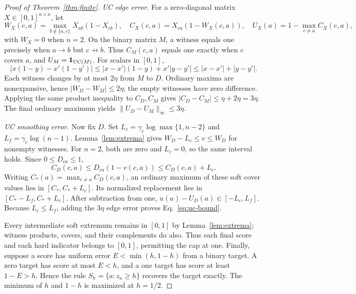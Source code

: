 \begin{proof}[Proof of Theorem~\ref{thm:finite}]
\emph{UC edge error.} For a zero-diagonal matrix $X\in[0,1]^{n\times n}$, let
\[
W_X(c,a)=\max_{b\notin\{a,c\}}X_{ab}(1-X_{cb}),\quad
C_X(c,a)=X_{ca}(1-W_X(c,a)),\quad
U_X(a)=1-\max_{c\ne a}C_X(c,a),
\]
with $W_X=0$ when $n=2$. On the binary matrix $M$, a witness equals one precisely when $a\to b$ but $c\not\to b$. Thus $C_M(c,a)$ equals one exactly when $c$ covers $a$, and $U_M=\mathbf1_{\mathrm{UC}(M)}$.
For scalars in $[0,1]$,
\[
|x(1-y)-x'(1-y')|
\le |x-x'|(1-y)+x'|y-y'|\le |x-x'|+|y-y'|.
\]
Each witness changes by at most $2\eta$ from $M$ to $D$. Ordinary maxima are nonexpansive, hence $|W_D-W_M|\le2\eta$; the empty witnesses have zero difference. Applying the same product inequality to $C_D,C_M$ gives $|C_D-C_M|\le\eta+2\eta=3\eta$. The final ordinary maximum yields $\|U_D-U_M\|_\infty\le3\eta$.

\emph{UC smoothing error.} Now fix $D$. Set $L_c=\gamma_c\log\max\{1,n-2\}$ and $L_f=\gamma_c\log(n-1)$. Lemma~\ref{lem:extrema} gives $W_D-L_c\le v\le W_D$ for nonempty witnesses. For $n=2$, both are zero and $L_c=0$, so the same interval holds. Since $0\le D_{ca}\le1$,
\[
C_D(c,a)\le D_{ca}(1-v(c,a))\le C_D(c,a)+L_c.
\]
Writing $C_*(a)=\max_{c\ne a}C_D(c,a)$, an ordinary maximum of these soft cover values lies in $[C_*,C_*+L_c]$. Its normalized replacement lies in $[C_*-L_f,C_*+L_c]$. After subtraction from one, $u(a)-U_D(a)\in[-L_c,L_f]$. Because $L_c\le L_f$, adding the $3\eta$ edge error proves Eq.~\eqref{eq:uc-bound}.

Every intermediate soft extremum remains in $[0,1]$ by Lemma~\ref{lem:extrema}; witness products, covers, and their complements do also. Thus each final score and each hard indicator belongs to $[0,1]$, permitting the cap at one. Finally, suppose a score has uniform error $E<\min(h,1-h)$ from a binary target. A zero target has score at most $E<h$, and a one target has score at least $1-E>h$. Hence the rule $S_h=\{a:z_a\ge h\}$ recovers the target exactly. The minimum of $h$ and $1-h$ is maximized at $h=1/2$.
\end{proof}

